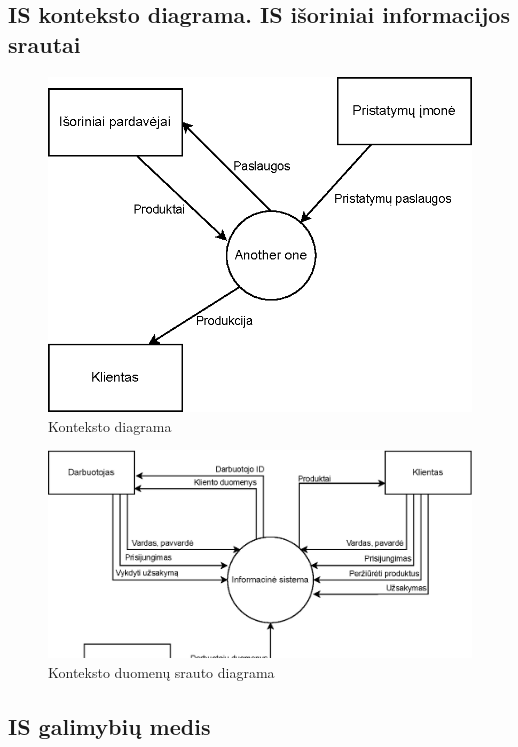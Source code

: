\documentclass{VUMIFPSkursinis}
\begin{document}
\subsection{IS konteksto diagrama. IS išoriniai informacijos srautai}
\begin{figure}[H]
    \centering
    \includegraphics[scale=1]{img/KontekstoDiagrama}
    \caption{Konteksto diagrama}
    \label{img:mlp}
\end{figure}


\begin{figure}[H]
    \centering
    \includegraphics[scale=1]{img/KontekstoDuomenuSrautoDiagrama}
    \caption{Konteksto duomenų srauto diagrama}
    \label{img:mlp}
\end{figure}
\newpage
\subsection{IS galimybių medis}
\end{document}
